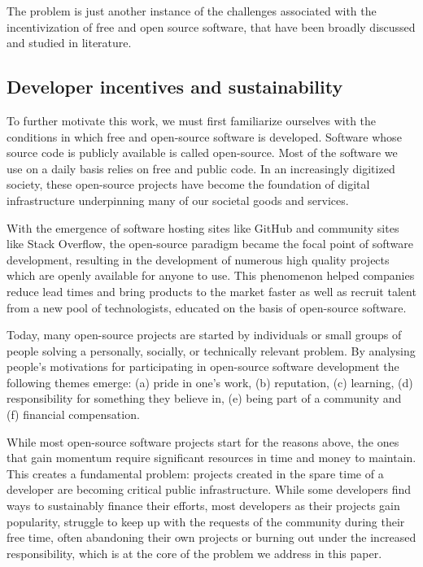 The problem is just another instance of the challenges associated with the
incentivization of free and open source software, that have been broadly
discussed and studied in literature.

\subsection{Developer incentives and sustainability}

To further motivate this work, we must first familiarize ourselves with the
conditions in which free and open-source software is developed. Software whose
source code is publicly available is called open-source. Most of the software
we use on a daily basis relies on free and public code. In an increasingly
digitized society, these open-source projects have become the foundation of
digital infrastructure underpinning many of our societal goods and services.

With the emergence of software hosting sites like GitHub and community sites
like Stack Overflow, the open-source paradigm became the focal point of
software development, resulting in the development of numerous high quality
projects which are openly available for anyone to use. This phenomenon helped
companies reduce lead times and bring products to the market faster as well as
recruit talent from a new pool of technologists, educated on the basis of
open-source software.

Today, many open-source projects are started by individuals or small groups of
people solving a personally, socially, or technically relevant problem. By
analysing people's motivations for participating in open-source software
development the following themes emerge: (a) pride in one's work, (b)
reputation, (c) learning, (d) responsibility for something they believe in, (e)
being part of a community and (f) financial compensation.

While most open-source software projects start for the reasons above, the ones
that gain momentum require significant resources in time and money to maintain.
This creates a fundamental problem: projects created in the spare time of a
developer are becoming critical public infrastructure. While some developers
find ways to sustainably finance their efforts, most developers as their
projects gain popularity, struggle to keep up with the requests of the
community during their free time, often abandoning their own projects or
burning out under the increased responsibility,  which is at the core of the
problem we address in this paper.

